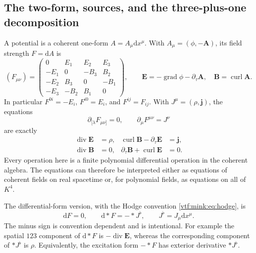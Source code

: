 \documentclass[11pt,letterpaper]{article}
\theoremstyle{definition}
\theoremstyle{remark}
\newcommand{\grad}{\operatorname{grad}}\newcommand{\Div}{\operatorname{div}}
\newcommand{\curl}{\operatorname{curl}}
\newcommand{\dd}{\mathrm d}
\begin{document}
\subsection{The two-form, sources, and the three-plus-one decomposition}
A potential is a coherent one-form $A=A_\mu\dd x^\mu$. With $A_\mu=(\phi,-\mathbf A)$, its field strength $F=\dd A$ is
\begin{equation}\label{vtf:mink:eq:Fmatrix}
 (F_{\mu\nu})=
 \begin{pmatrix}
 0&E_1&E_2&E_3\\
 -E_1&0&-B_3&B_2\\
 -E_2&B_3&0&-B_1\\
 -E_3&-B_2&B_1&0
 \end{pmatrix},
 \qquad \mathbf E=-\grad\phi-\partial_\tau\mathbf A,
 \quad \mathbf B=\curl\mathbf A.
\end{equation}
In particular $F^{0i}=-E_i$, $F^{i0}=E_i$, and $F^{ij}=F_{ij}$. With $J^\mu=(\rho,\mathbf j)$, the equations
\begin{equation}\label{vtf:mink:eq:maxwellcov}
 \partial_{[\lambda}F_{\mu\nu]}=0,
 \qquad \partial_\mu F^{\mu\nu}=J^\nu
\end{equation}
are exactly
\begin{align}
 \Div\mathbf E&=\rho,&
 \curl\mathbf B-\partial_\tau\mathbf E&=\mathbf j,\label{vtf:mink:eq:maxwell3a}\\
 \Div\mathbf B&=0,&
 \partial_\tau\mathbf B+\curl\mathbf E&=0.\label{vtf:mink:eq:maxwell3b}
\end{align}
Every operation here is a finite polynomial differential operation in the coherent algebra. The equations can therefore be interpreted either as equations of coherent fields on real spacetime or, for polynomial fields, as equations on all of $K^4$.

The differential-form version, with the Hodge convention \cref{vtf:mink:eq:hodge}, is
\begin{equation}\label{vtf:mink:eq:maxwellforms}
 \dd F=0,\qquad \dd* F=-* J^\flat,
 \qquad J^\flat=J_\mu\dd x^\mu.
\end{equation}
The minus sign is convention dependent and is intentional. For example the spatial $123$ component of $\dd* F$ is $-\Div\mathbf E$, whereas the corresponding component of $* J^\flat$ is $\rho$. Equivalently, the excitation form $-* F$ has exterior derivative $* J^\flat$.
\end{document}
